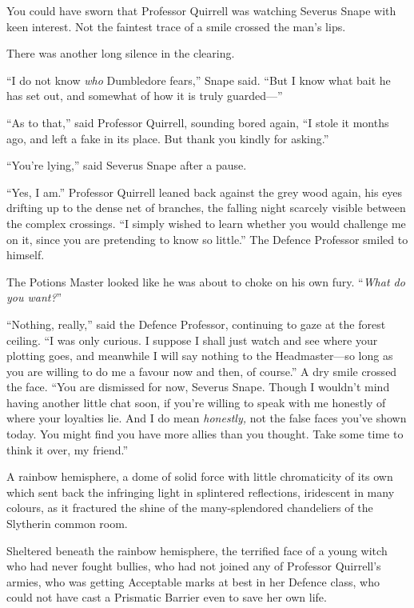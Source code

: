 You could have sworn that Professor Quirrell was watching Severus Snape with
keen interest. Not the faintest trace of a smile crossed the man’s lips.

There was another long silence in the clearing.

“I do not know \emph{who} Dumbledore fears,” Snape said. “But I know what bait
he has set out, and somewhat of how it is truly guarded—”

“As to that,” said Professor Quirrell, sounding bored again, “I stole it months
ago, and left a fake in its place. But thank you kindly for asking.”

“You’re lying,” said Severus Snape after a pause.

“Yes, I am.” Professor Quirrell leaned back against the grey wood again, his
eyes drifting up to the dense net of branches, the falling night scarcely
visible between the complex crossings. “I simply wished to learn whether you
would challenge me on it, since you are pretending to know so little.” The Defence
Professor smiled to himself.

The Potions Master looked like he was about to choke on his own fury.
“\emph{What do you want?}”

“Nothing, really,” said the Defence Professor, continuing to gaze at the forest
ceiling. “I was only curious. I suppose I shall just watch and see where your
plotting goes, and meanwhile I will say nothing to the Headmaster—so long as
you are willing to do me a favour now and then, of course.” A dry smile crossed
the face. “You are dismissed for now, Severus Snape. Though I wouldn’t mind
having another little chat soon, if you’re willing to speak with me honestly of
where your loyalties lie. And I do mean \emph{honestly,} not the false faces
you’ve shown today. You might find you have more allies than you thought. Take
some time to think it over, my friend.”

A rainbow hemisphere, a dome of solid force with little chromaticity of its own
which sent back the infringing light in splintered reflections, iridescent in
many colours, as it fractured the shine of the many-splendored chandeliers of
the Slytherin common room.

Sheltered beneath the rainbow hemisphere, the terrified face of a young witch
who had never fought bullies, who had not joined any of Professor Quirrell’s
armies, who was getting Acceptable marks at best in her Defence class, who
could not have cast a Prismatic Barrier even to save her own life.

